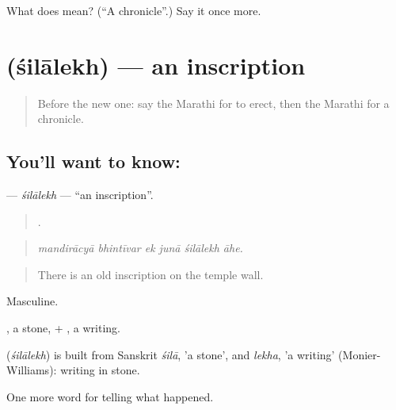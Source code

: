 \begin{tcolorbox}[breakable,colback=teal!4,colframe=teal!35!black,title={Before you move on}]
What does  mean? (\textquotedblleft{}A chronicle\textquotedblright{}.) Say it once more.
\end{tcolorbox}
\section[\texorpdfstring{\mr{शिलालेख} (śilālekh)}{शिलालेख (śilālekh)}]{ (śilālekh) — an inscription}

\label{lesson:MR-C334-silalekh}



\begin{quote}
Before the new one: say the Marathi for to erect, then the Marathi for a chronicle.
\end{quote}

\subsection*{You'll want to know: }
\textbf{} — \emph{śilālekh} — \textquotedblleft{}an inscription\textquotedblright{}.

\begin{quote}
     .
\end{quote}

\begin{quote}
\emph{mandirācyā bhintīvar ek junā śilālekh āhe.}
\end{quote}

\begin{quote}
There is an old inscription on the temple wall.
\end{quote}

Masculine.

, a stone, + , a writing.

\begin{cousinweb}
\textbf{} (\emph{śilālekh}) is built from Sanskrit \emph{śilā}, 'a stone', and \emph{lekha}, 'a writing' (Monier-Williams): writing in stone.
\end{cousinweb}

\begin{grammarlens}[title={What you've built}]
One more word for telling what happened.
\end{grammarlens}

